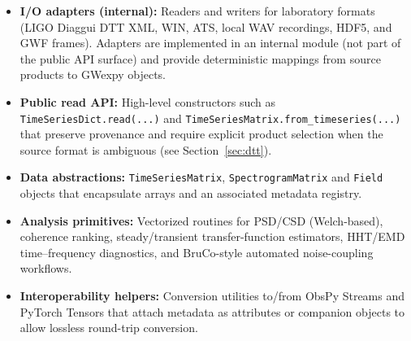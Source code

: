 \documentclass[preprint,12pt,a4paper]{elsarticle}
\begin{document}
\begin{itemize}
  \item \textbf{I/O adapters (internal):} Readers and writers for laboratory formats (LIGO Diaggui DTT XML, WIN, ATS, local WAV recordings, HDF5, and GWF frames).  Adapters are implemented in an internal module (not part of the public API surface) and provide deterministic mappings from source products to GWexpy objects.
  \item \textbf{Public read API:} High-level constructors such as \texttt{TimeSeriesDict.read(...)} and \texttt{TimeSeriesMatrix.from\_timeseries(...)} that preserve provenance and require explicit product selection when the source format is ambiguous (see Section~\ref{sec:dtt}).
  \item \textbf{Data abstractions:} \texttt{TimeSeriesMatrix}, \texttt{SpectrogramMatrix} and \texttt{Field} objects that encapsulate arrays and an associated metadata registry.
  \item \textbf{Analysis primitives:} Vectorized routines for PSD/CSD (Welch-based), coherence ranking, steady/transient transfer-function estimators, HHT/EMD time--frequency diagnostics, and BruCo-style automated noise-coupling workflows.
  \item \textbf{Interoperability helpers:} Conversion utilities to/from ObsPy Streams and PyTorch Tensors that attach metadata as attributes or companion objects to allow lossless round-trip conversion.
\end{itemize}
\end{document}
